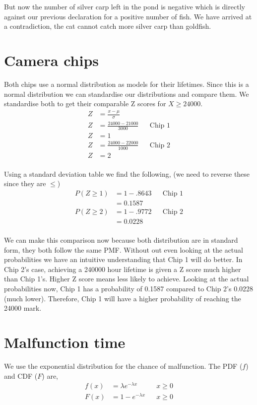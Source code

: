 \documentclass{article}
\begin{document}
But now the number of silver carp left in the pond is negative which is
directly against our previous declaration for a positive number of fish. We
have arrived at a contradiction, the cat cannot catch more silver carp than
goldfish.

\section{Camera chips}
Both chips use a normal distribution as models for their lifetimes.
Since this is a normal distribution we can standardise our distributions
and compare them.
We standardise both to get their comparable Z scores for $X\geq24000$.
\begin{align*}
    Z &= \frac{x - \mu}{\sigma} \\
    Z &= \frac{24000 - 21000}{3000} && \text{Chip 1} \\
    Z &= 1 \\
    Z &= \frac{24000 - 22000}{1000} && \text{Chip 2} \\
    Z &= 2 \\
\end{align*}

Using a standard deviation table we find the following, (we need to reverse
these since they are $\leq$)
\begin{align*}
    P(Z \geq 1) &= 1 - .8643 && \text{Chip 1} \\
    &= 0.1587 \\
    P(Z \geq 2) &= 1 - .9772 && \text{Chip 2} \\
    &= 0.0228 \\
\end{align*}

We can make this comparison now because both distribution are in standard form,
they both follow the same PMF. Without out even looking at the actual
probabilities we have an intuitive understanding that Chip 1 will do better.
In Chip 2's case, achieving a 240000 hour
lifetime is given a Z score much higher than Chip 1's. Higher Z score means
less likely to achieve. Looking at the actual probabilities now, Chip 1 has a
probability of 0.1587 compared to Chip 2's 0.0228 (much lower). Therefore,
Chip 1 will have a higher probability of reaching the 24000 mark.

\section{Malfunction time}
We use the exponential distribution for the chance of malfunction.
The PDF ($f$) and CDF ($F$) are,
\begin{align*}
    f(x) &= \lambda e^{-\lambda x} && x\geq0 \\
    F(x) &= 1-e^{-\lambda x} && x\geq0 \\
\end{align*}
\end{document}
